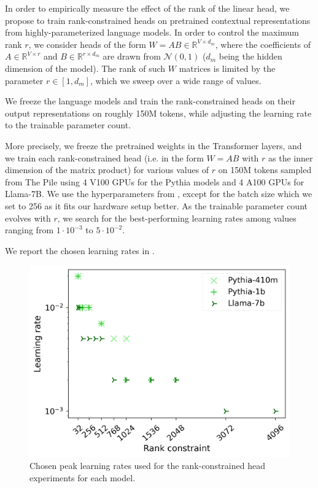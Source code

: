 In order to empirically measure the effect of the rank of the linear head, we propose to train rank-constrained heads on pretrained contextual representations from highly-parameterized language models. In order to control the maximum rank $r$, we consider heads of the form $W = AB \in \mathbb{R}^{V \times d_m}$, where the coefficients of $A \in \mathbb{R}^{V \times r}$ and $B \in \mathbb{R}^{r \times d_m}$ are drawn from $\mathcal{N}(0, 1)$ ($d_m$ being the hidden dimension of the model). The rank of such $W$ matrices is limited by the parameter $r \in [1, d_m]$, which we sweep over a wide range of values.

We freeze the language models and train the rank-constrained heads on their output representations on roughly 150M tokens, while adjusting the learning rate to the trainable parameter count.

More precisely, we freeze the pretrained weights in the Transformer layers, and we train each rank-constrained head (i.e. in the form $W=AB$ with $r$ as the inner dimension of the matrix product) for various values of $r$ on 150M tokens sampled from The Pile using 4 V100 GPUs for the Pythia models and 4 A100 GPUs for Llama-7B. We use the hyperparameters from \citet{biderman2023pythia}, except for the batch size which we set to 256 as it fits our hardware setup better. As the trainable parameter count evolves with $r$, we search for the best-performing learning rates among values ranging from $1\cdot 10^{-3}$ to $5\cdot 10^{-2}$.

We report the chosen learning rates in .

\begin{figure}[ht]
\centering
    \includegraphics[width=0.6\linewidth]{sources/part_1/softmax_bottleneck/imgs/lr_final.png}
    \caption{Chosen peak learning rates used for the rank-constrained head experiments for each model.}
    \label{fig:lr_choices}
\end{figure}


